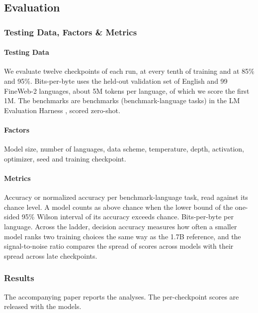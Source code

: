 \subsection*{Evaluation}

\subsubsection*{Testing Data, Factors \& Metrics}

\paragraph{Testing Data}

We evaluate twelve checkpoints of each run, at every tenth of training and at 85\% and 95\%. Bits-per-byte uses the held-out validation set of English and 99 FineWeb-2 languages, about 5M tokens per language, of which we score the first 1M. The benchmarks are \nbenchanalysed benchmarks (\ntasksanalysed benchmark-language tasks) in the LM Evaluation Harness \citep{gao_framework_2021}, scored zero-shot.

\paragraph{Factors}

Model size, number of languages, data scheme, temperature, depth, activation, optimizer, seed and training checkpoint.

\paragraph{Metrics}

Accuracy or normalized accuracy per benchmark-language task, read against its chance level. A model counts as above chance when the lower bound of the one-sided 95\% Wilson interval of its accuracy exceeds chance. Bits-per-byte per language. Across the ladder, decision accuracy measures how often a smaller model ranks two training choices the same way as the 1.7B reference, and the signal-to-noise ratio compares the spread of scores across models with their spread across late checkpoints.

\subsubsection*{Results}

The accompanying paper reports the analyses. The per-checkpoint scores are released with the models.

